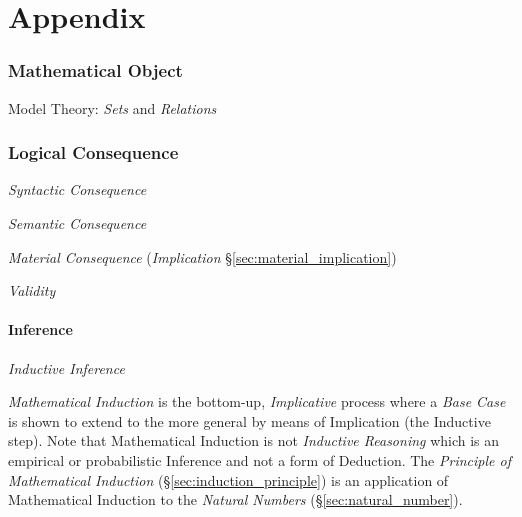 \part{Appendix}\label{sec:appendix}

\section{Mathematical Object}\label{sec:mathematical_object}

Model Theory: \emph{Sets} and \emph{Relations}



\section{Logical Consequence}\label{sec:logical_consequence}

\emph{Syntactic Consequence}

\emph{Semantic Consequence}

\emph{Material Consequence} (\emph{Implication}
\S\ref{sec:material_implication})

\emph{Validity}



\subsection{Inference}\label{sec:mathematical_inference}

\emph{Inductive Inference}

\emph{Mathematical Induction} is the bottom-up, \emph{Implicative}
process where a \emph{Base Case} is shown to extend to the more
general by means of Implication (the Inductive step). Note that
Mathematical Induction is not \emph{Inductive Reasoning} which is an
empirical or probabilistic Inference and not a form of Deduction. The
\emph{Principle of Mathematical Induction}
(\S\ref{sec:induction_principle}) is an application of Mathematical
Induction to the \emph{Natural Numbers} (\S\ref{sec:natural_number}).


